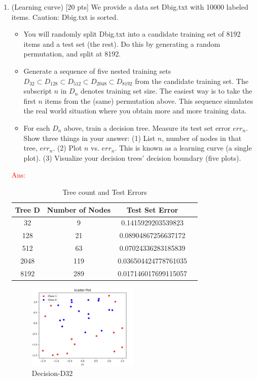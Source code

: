 \documentclass[a4paper]{article}
\theoremstyle{definition}
\newcommand{\red}[1]{\textcolor{red}{#1}}
\begin{document}
\begin{enumerate}
\item (Learning curve)  [20 pts] We provide a data set Dbig.txt with 10000 labeled items.  Caution: Dbig.txt is sorted.
  \begin{itemize}
  
  \item You will randomly split Dbig.txt into a candidate training set of 8192 items and a test set (the rest).  Do this by generating a random permutation, and split at 8192.
  
  \item Generate a sequence of five nested training sets $D_{32} \subset D_{128} \subset D_{512} \subset D_{2048} \subset D_{8192}$ from the candidate training set.  The subscript $n$ in $D_n$ denotes training set size.  The easiest way is to take the first $n$ items from the (same) permutation above.  This sequence simulates the real world situation where you obtain more and more training data.
  
  \item For each $D_n$ above, train a decision tree.  Measure its test set error $err_n$.  Show three things in your answer: (1) List $n$, number of nodes in that tree, $err_n$. (2) Plot $n$ vs. $err_n$.  This is known as a learning curve (a single plot). (3) Visualize your decision trees' decision boundary (five plots). \\
  \end{itemize}

  \red{Ans:}
\begin{table}[h]
    \centering
    \caption{Tree count and Test Errors}
    \begin{tabular}{cccc}
        \toprule
        \textbf{Tree D} & \textbf{Number of Nodes} & \textbf{Test Set Error} \\
        \midrule
        32   & 9   & 0.1415929203539823 \\
        128  & 21  & 0.08904867256637172 \\
        512  & 63  & 0.07024336283185839 \\
        2048 & 119 & 0.036504424778761035 \\
        8192 & 289 & 0.017146017699115057 \\
        \bottomrule
    \end{tabular}
\end{table}


\begin{figure}[htbp]
  \centering
  \includegraphics[width=0.5\textwidth]{D32.png}
  \caption{Decision-D32}
  \label{fig:Decision_D32}
\end{figure}


\end{enumerate}
\end{document}
